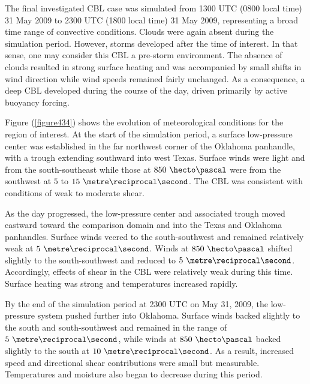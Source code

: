 The final investigated CBL case was simulated from 1300 UTC (0800 local time) 31 May 2009 to 2300 UTC (1800 local time) 31 May 2009, representing a broad time range of convective conditions. Clouds were again absent during the simulation period. However, storms developed after the time of interest. In that sense, one may consider this CBL a pre-storm environment. The absence of clouds resulted in strong surface heating and was accompanied by small shifts in wind direction while wind speeds remained fairly unchanged. As a consequence, a deep CBL developed during the course of the day, driven primarily by active buoyancy forcing. 

Figure (\autoref{figure434}) shows the evolution of meteorological conditions for the region of interest. At the start of the simulation period, a surface low-pressure center was established in the far northwest corner of the Oklahoma panhandle, with a trough extending southward into west Texas. Surface winds were light and from the south-southeast while those at $850\mbox{ }\hecto\pascal$ were from the southwest at $5$ to $15\mbox{ }\metre\reciprocal\second$. The CBL was consistent with conditions of weak to moderate shear. 

As the day progressed, the low-pressure center and associated trough moved eastward toward the comparison domain and into the Texas and Oklahoma panhandles. Surface winds veered to the south-southwest and remained relatively weak at $5\mbox{ }\metre\reciprocal\second$. Winds at $850\mbox{ }\hecto\pascal$ shifted slightly to the south-southwest and reduced to $5\mbox{ }\metre\reciprocal\second$. Accordingly, effects of shear in the CBL were relatively weak during this time. Surface heating was strong and temperatures increased rapidly. 

By the end of the simulation period at 2300 UTC on May 31, 2009, the low-pressure system pushed further into Oklahoma. Surface winds backed slightly to the south and south-southwest and remained in the range of $5\mbox{ }\metre\reciprocal\second$, while winds at $850\mbox{ }\hecto\pascal$ backed slightly to the south at $10\mbox{ }\metre\reciprocal\second$. As a result, increased speed and directional shear contributions were small but measurable. Temperatures and moisture also began to decrease during this period.

